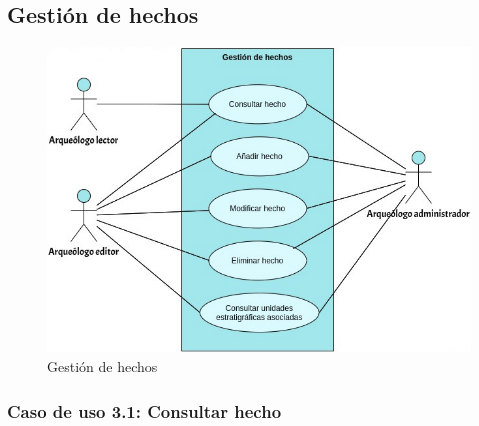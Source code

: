 \subsection{Gestión de hechos}
    \begin{figure}[H]
        \centering
        \includegraphics[scale=0.50]{imagenes/diagramas CU/fact-UC.png}
        \caption{Gestión de hechos}
        \label{fig:fact-management}
    \end{figure}

\subsubsection{Caso de uso 3.1: Consultar hecho}

